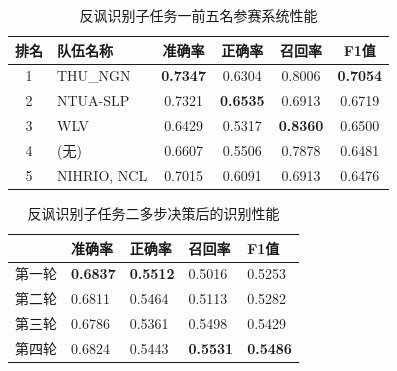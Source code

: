 \begin{table}[htb]
  \centering
  \begin{minipage}[t]{0.8\linewidth}
  \caption{反讽识别子任务一前五名参赛系统性能}
  \label{tab:exp_irony_det_A_other_comp}
    \begin{tabularx}{\linewidth}{c|X|cccc}
    \toprule[1.5pt]
    排名 & 队伍名称 & 准确率 & 正确率 & 召回率 & F1值 \\
    \hline 
    1 & THU\_NGN & \bf 0.7347 & 0.6304 & 0.8006 & \bf 0.7054 \\
    2 & NTUA-SLP & 0.7321 & \bf 0.6535 & 0.6913 & 0.6719 \\
    3 & WLV & 0.6429 & 0.5317 & \bf 0.8360 & 0.6500 \\
    4 & (无) & 0.6607 & 0.5506 & 0.7878 & 0.6481 \\
    5 & NIHRIO, NCL & 0.7015 & 0.6091 & 0.6913 & 0.6476 \\


    \bottomrule[1.5pt]
    \end{tabularx}
  \end{minipage}
\end{table}


\begin{table}[htb]
  \centering
  \begin{minipage}[t]{0.7\linewidth}
  \caption{反讽识别子任务二多步决策后的识别性能}
  \label{tab:exp_irony_det_result_ensemble}
    \begin{tabularx}{\linewidth}{X|XXXX}
    \toprule[1.5pt]
    & 准确率 & 正确率 & 召回率 & F1值 \\
    \hline
    第一轮 & \bf 0.6837 & \bf 0.5512 & 0.5016 & 0.5253 \\
    第二轮 & 0.6811 & 0.5464 & 0.5113 & 0.5282 \\
    第三轮 & 0.6786 & 0.5361 & 0.5498 & 0.5429 \\ 
    第四轮 & 0.6824 & 0.5443 & \bf 0.5531 & \bf 0.5486 \\
    \bottomrule[1.5pt]
    \end{tabularx}
  \end{minipage}
\end{table}

